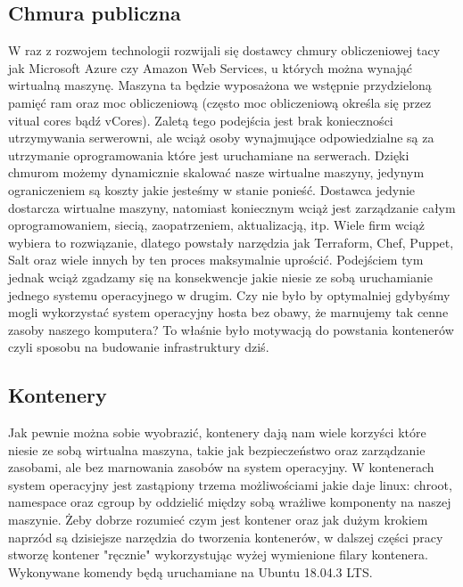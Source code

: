 \subsection{Chmura publiczna}
W raz z rozwojem technologii rozwijali się dostawcy chmury obliczeniowej tacy jak Microsoft Azure czy Amazon Web Services, u których można wynająć wirtualną maszynę. Maszyna ta będzie wyposażona we wstępnie przydzieloną pamięć ram oraz moc obliczeniową (często moc obliczeniową określa się przez vitual cores bądź vCores). 
Zaletą tego podejścia jest brak konieczności utrzymywania serwerowni, ale wciąż osoby wynajmujące odpowiedzialne są za utrzymanie oprogramowania które jest uruchamiane na serwerach. 
Dzięki chmurom możemy dynamicznie skalować nasze wirtualne maszyny, jedynym ograniczeniem są koszty jakie jesteśmy w stanie ponieść. Dostawca jedynie dostarcza wirtualne maszyny, natomiast koniecznym wciąż jest zarządzanie całym oprogramowaniem, siecią, zaopatrzeniem, aktualizacją, itp. Wiele firm wciąż wybiera to rozwiązanie, dlatego powstały narzędzia jak Terraform, Chef, Puppet, Salt oraz wiele innych by ten proces maksymalnie uprościć. 
Podejściem tym jednak wciąż zgadzamy się na konsekwencje jakie niesie ze sobą uruchamianie jednego systemu operacyjnego w drugim. Czy nie było by optymalniej gdybyśmy mogli wykorzystać system operacyjny hosta bez obawy, że marnujemy tak cenne zasoby naszego komputera? To właśnie było motywacją do powstania kontenerów czyli sposobu na budowanie infrastruktury dziś. 
\subsection{Kontenery}
Jak pewnie można sobie wyobrazić, kontenery dają nam wiele korzyści które niesie ze sobą wirtualna maszyna, takie jak bezpieczeństwo oraz zarządzanie zasobami, ale bez marnowania zasobów na system operacyjny. W kontenerach system operacyjny jest zastąpiony trzema możliwościami jakie daje linux: chroot, namespace oraz cgroup by oddzielić między sobą wrażliwe komponenty na naszej maszynie.
Żeby dobrze rozumieć czym jest kontener oraz jak dużym krokiem naprzód są dzisiejsze narzędzia do tworzenia kontenerów, w dalszej części pracy stworzę kontener "ręcznie" wykorzystując wyżej wymienione filary kontenera. Wykonywane komendy będą uruchamiane na Ubuntu 18.04.3 LTS.


